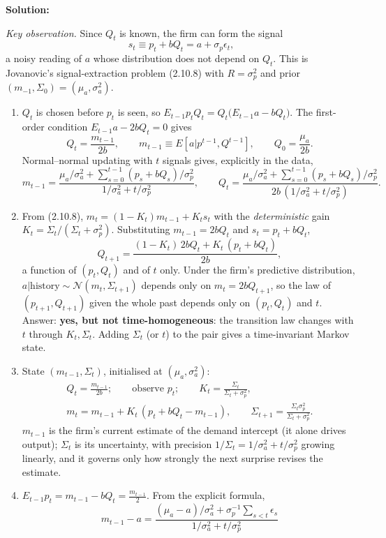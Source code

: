 \documentclass[12pt, letterpaper]{article}
\begin{document}
\begin{tcolorbox}[oddbox,title={Exercise 2.23 \quad A Monopolist, Learning, and Ergodicity}]
\textbf{Solution:}

\emph{Key observation.} Since $Q_t$ is known, the firm can form the signal
\[
s_t\equiv p_t+bQ_t=a+\sigma_p\epsilon_t,
\]
a noisy reading of $a$ whose distribution does not depend on $Q_t$. This is Jovanovic's
signal-extraction problem (2.10.8) with $R=\sigma_p^2$ and prior $(m_{-1},\Sigma_0)=(\mu_a,\sigma_a^2)$.
\begin{enumerate}
\item $Q_t$ is chosen before $p_t$ is seen, so $E_{t-1}p_tQ_t=Q_t\big(E_{t-1}a-bQ_t\big)$. The
first-order condition $E_{t-1}a-2bQ_t=0$ gives
\[
\boxed{Q_t=\frac{m_{t-1}}{2b}},\qquad m_{t-1}\equiv E[a|p^{t-1},Q^{t-1}],\qquad
\boxed{Q_0=\frac{\mu_a}{2b}}.
\]
Normal--normal updating with $t$ signals gives, explicitly in the data,
\[
m_{t-1}=\frac{\mu_a/\sigma_a^2+\sum_{s=0}^{t-1}(p_s+bQ_s)/\sigma_p^2}{1/\sigma_a^2+t/\sigma_p^2},
\qquad Q_t=\frac{\mu_a/\sigma_a^2+\sum_{s=0}^{t-1}(p_s+bQ_s)/\sigma_p^2}{2b\,(1/\sigma_a^2+t/\sigma_p^2)}.
\]
\item From (2.10.8), $m_t=(1-K_t)m_{t-1}+K_ts_t$ with the \emph{deterministic} gain
$K_t=\Sigma_t/(\Sigma_t+\sigma_p^2)$. Substituting $m_{t-1}=2bQ_t$ and $s_t=p_t+bQ_t$,
\[
Q_{t+1}=\frac{(1-K_t)\,2bQ_t+K_t\,(p_t+bQ_t)}{2b},
\]
a function of $(p_t,Q_t)$ and of $t$ only. Under the firm's predictive distribution,
$a|\text{history}\sim\mathcal N(m_t,\Sigma_{t+1})$ depends only on $m_t=2bQ_{t+1}$, so the law of
$(p_{t+1},Q_{t+1})$ given the whole past depends only on $(p_t,Q_t)$ and $t$. Answer: \textbf{yes,
but not time-homogeneous}: the transition law changes with $t$ through $K_t,\Sigma_t$. Adding
$\Sigma_t$ (or $t$) to the pair gives a time-invariant Markov state.
\item State $(m_{t-1},\Sigma_t)$, initialised at $(\mu_a,\sigma_a^2)$:
\[
\begin{gathered}
Q_t=\frac{m_{t-1}}{2b};\qquad\text{observe }p_t;\qquad
K_t=\frac{\Sigma_t}{\Sigma_t+\sigma_p^2},\\
m_t=m_{t-1}+K_t\,(p_t+bQ_t-m_{t-1}),\qquad
\Sigma_{t+1}=\frac{\Sigma_t\sigma_p^2}{\Sigma_t+\sigma_p^2}.
\end{gathered}
\]
$m_{t-1}$ is the firm's current estimate of the demand intercept (it alone drives output); $\Sigma_t$
is its uncertainty, with precision $1/\Sigma_t=1/\sigma_a^2+t/\sigma_p^2$ growing linearly, and it
governs only how strongly the next surprise revises the estimate.
\item $E_{t-1}p_t=m_{t-1}-bQ_t=\frac{m_{t-1}}2$. From the explicit formula,
\[
m_{t-1}-a=\frac{(\mu_a-a)/\sigma_a^2+\sigma_p^{-1}\sum_{s<t}\epsilon_s}{1/\sigma_a^2+t/\sigma_p^2}
\]
\end{enumerate}
\end{tcolorbox}
\end{document}
